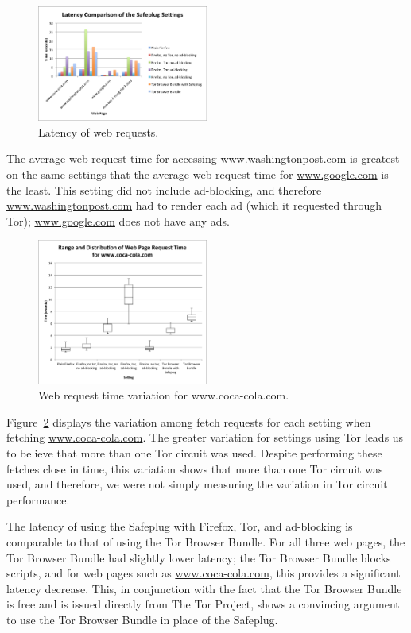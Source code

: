 \documentclass[letterpaper,twocolumn,10pt]{article}
\begin{document}
\begin{figure}
  \centering
  \includegraphics[width=0.5\textwidth]{latencygraph}
  \caption{Latency of web requests.}
  \label{fig:latency2}
\end{figure}

The average web request time for accessing \url{www.washingtonpost.com} is greatest on the same settings that the average web request time for \url{www.google.com} is the least. This setting did not include ad-blocking, and therefore \url{www.washingtonpost.com} had to render each ad (which it requested through Tor); \url{www.google.com} does not have any ads.

\begin{figure}
  \centering
  \includegraphics[width=0.5\textwidth]{rangeanddistcocacola}
  \caption{Web request time variation for www.coca-cola.com.}
  \label{fig:boxandwhisker}
\end{figure}

Figure~\ref{fig:boxandwhisker} displays the variation among fetch requests for each setting when fetching \url{www.coca-cola.com}.  The greater variation for settings using Tor leads us to believe that more than one Tor circuit was used.  Despite performing these fetches close in time, this variation shows that more than one Tor circuit was used, and therefore, we were not simply measuring the variation in Tor circuit performance.  

The latency of using the Safeplug with Firefox, Tor, and ad-blocking is comparable to that of using the Tor Browser Bundle.  For all three web pages, the Tor Browser Bundle had slightly lower latency; the Tor Browser Bundle blocks scripts, and for web pages such as \url{www.coca-cola.com}, this provides a significant latency decrease.  This, in conjunction with the fact that the Tor Browser Bundle is free and is issued directly from The Tor Project, shows a convincing argument to use the Tor Browser Bundle in place of the Safeplug.  
\end{document}
